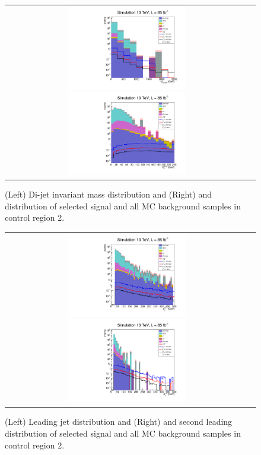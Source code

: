 \begin{figure}[tbh!]
	\centering
	\begin{tabular}{cc}
		\includegraphics[width=0.5\textwidth]{analysis/pics/h_dijetinvariantmass_Tau2TightIsoVBFInverted.pdf}
		\includegraphics[width=0.5\textwidth]{analysis/pics/h_met_Tau2TightIsoVBFInverted.pdf}
	\end{tabular}
	\caption{(Left) Di-jet invariant mass distribution and (Right) and \met distribution of selected signal and all MC background samples in control region 2.}
	\label{fig::crplots1_Tau2TightIsoVBFInverted_13tev}
\end{figure}

\begin{figure}[tbh!]
	\centering
	\begin{tabular}{cc}
		\includegraphics[width=0.5\textwidth]{analysis/pics/h_jet1pt_Tau2TightIsoVBFInverted.pdf}
		\includegraphics[width=0.5\textwidth]{analysis/pics/h_tau2pt_Tau2TightIsoVBFInverted.pdf}
	\end{tabular}
	\caption{(Left) Leading jet \pt distribution and (Right) and second leading \hadtau \pt distribution of selected signal and all MC background samples in control region 2.}
	\label{fig::crplots2_Taui2TightIsoVBFInverted_13tev}
\end{figure}

